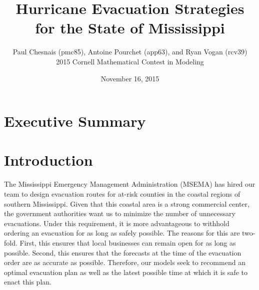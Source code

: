\documentclass[titlepage]{article}
\title{Hurricane Evacuation Strategies for the State of Mississippi}
\author{Paul Chesnais (pmc85), Antoine Pourchet (app63), and Ryan Vogan (rcv39)\\2015 Cornell Mathematical Contest in Modeling}
\date{November 16, 2015}
\begin{document}
\maketitle
\thispagestyle{empty}

\section{Executive Summary}
\label{sec:summary}

\section{Introduction}
\label{sec:introduction}
  The Mississippi Emergency Management Administration (MSEMA) has hired our team to design evacuation routes for at-risk counties in the coastal regions of southern Mississippi. Given that this coastal area is a strong commercial center, the government authorities want us to minimize the number of unnecessary evacuations. Under this requirement, it is more advantageous to withhold ordering an evacuation for as long as safely possible. The reasons for this are two-fold. First, this ensures that local businesses can remain open for as long as possible. Second, this ensures that the forecasts at the time of the evacuation order are as accurate as possible. Therefore, our models seek to recommend an optimal evacuation plan as well as the latest possible time at which it is safe to enact this plan.
\end{document}
